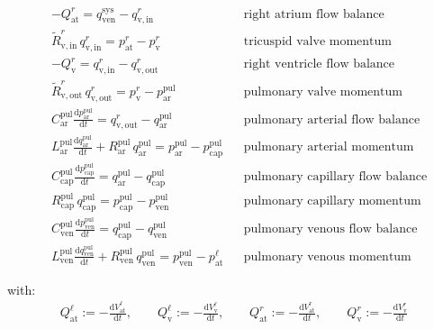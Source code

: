 \documentclass[a4paper,12pt]{report}
\begin{document}
\begin{equation}
\label{equation-syspulcap-2}
\begin{aligned}
&-Q_{\mathrm{at}}^{r} = q_{\mathrm{ven}}^{\mathrm{sys}} - q_{\mathrm{v,in}}^{r} && \text{right atrium flow balance}\\
&\tilde{R}_{\mathrm{v,in}}^{r}\,q_{\mathrm{v,in}}^{r} = p_{\mathrm{at}}^{r}-p_{\mathrm{v}}^{r} && \text{tricuspid valve momentum}\\
&-Q_{\mathrm{v}}^{r} = q_{\mathrm{v,in}}^{r} - q_{\mathrm{v,out}}^{r} && \text{right ventricle flow balance}\nonumber\\
&\tilde{R}_{\mathrm{v,out}}^{r}\,q_{\mathrm{v,out}}^{r} = p_{\mathrm{v}}^{r}-p_{\mathrm{ar}}^{\mathrm{pul}} && \text{pulmonary valve momentum}\nonumber\\
&C_{\mathrm{ar}}^{\mathrm{pul}} \frac{\mathrm{d}p_{\mathrm{ar}}^{\mathrm{pul}}}{\mathrm{d}t} = q_{\mathrm{v,out}}^{r} - q_{\mathrm{ar}}^{\mathrm{pul}} && \text{pulmonary arterial flow balance}\\
&L_{\mathrm{ar}}^{\mathrm{pul}}\frac{\mathrm{d}q_{\mathrm{ar}}^{\mathrm{pul}}}{\mathrm{d}t} + R_{\mathrm{ar}}^{\mathrm{pul}}\,q_{\mathrm{ar}}^{\mathrm{pul}}=p_{\mathrm{ar}}^{\mathrm{pul}} -p_{\mathrm{cap}}^{\mathrm{pul}} && \text{pulmonary arterial momentum}\\
&C_{\mathrm{cap}}^{\mathrm{pul}} \frac{\mathrm{d}p_{\mathrm{cap}}^{\mathrm{pul}}}{\mathrm{d}t} = q_{\mathrm{ar}}^{\mathrm{pul}} - q_{\mathrm{cap}}^{\mathrm{pul}} && \text{pulmonary capillary flow balance}\\
&R_{\mathrm{cap}}^{\mathrm{pul}}\,q_{\mathrm{cap}}^{\mathrm{pul}}=p_{\mathrm{cap}}^{\mathrm{pul}}-p_{\mathrm{ven}}^{\mathrm{pul}} && \text{pulmonary capillary momentum}\\
&C_{\mathrm{ven}}^{\mathrm{pul}} \frac{\mathrm{d}p_{\mathrm{ven}}^{\mathrm{pul}}}{\mathrm{d}t} = q_{\mathrm{cap}}^{\mathrm{pul}} - q_{\mathrm{ven}}^{\mathrm{pul}} && \text{pulmonary venous flow balance}\\
&L_{\mathrm{ven}}^{\mathrm{pul}}\frac{\mathrm{d}q_{\mathrm{ven}}^{\mathrm{pul}}}{\mathrm{d}t} + R_{\mathrm{ven}}^{\mathrm{pul}}\, q_{\mathrm{ven}}^{\mathrm{pul}}=p_{\mathrm{ven}}^{\mathrm{pul}}-p_{\mathrm{at}}^{\ell} && \text{pulmonary venous momentum}
\end{aligned}
\end{equation}

with:
\begin{equation}
\begin{aligned}
Q_{\mathrm{at}}^{\ell} := -\frac{\mathrm{d}V_{\mathrm{at}}^{\ell}}{\mathrm{d}t}, \qquad
Q_{\mathrm{v}}^{\ell} := -\frac{\mathrm{d}V_{\mathrm{v}}^{\ell}}{\mathrm{d}t}, \qquad
Q_{\mathrm{at}}^{r} := -\frac{\mathrm{d}V_{\mathrm{at}}^{r}}{\mathrm{d}t}, \qquad
Q_{\mathrm{v}}^{r} := -\frac{\mathrm{d}V_{\mathrm{v}}^{r}}{\mathrm{d}t}\nonumber
\end{aligned}
\end{equation}
\end{document}
